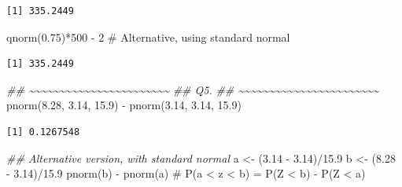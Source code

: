 \documentclass[
  letterpaper,
  DIV=11,
  numbers=noendperiod,
  oneside]{scrreprt}
\newenvironment{Shaded}{\begin{snugshade}}{\end{snugshade}}
\newcommand{\CommentTok}[1]{\textcolor[rgb]{0.37,0.37,0.37}{#1}}
\newcommand{\DecValTok}[1]{\textcolor[rgb]{0.68,0.00,0.00}{#1}}
\newcommand{\DocumentationTok}[1]{\textcolor[rgb]{0.37,0.37,0.37}{\textit{#1}}}
\newcommand{\FloatTok}[1]{\textcolor[rgb]{0.68,0.00,0.00}{#1}}
\newcommand{\FunctionTok}[1]{\textcolor[rgb]{0.28,0.35,0.67}{#1}}
\newcommand{\NormalTok}[1]{\textcolor[rgb]{0.00,0.23,0.31}{#1}}
\newcommand{\OtherTok}[1]{\textcolor[rgb]{0.00,0.23,0.31}{#1}}
\newcommand{\SpecialCharTok}[1]{\textcolor[rgb]{0.37,0.37,0.37}{#1}}
\begin{document}
\begin{verbatim}
[1] 335.2449
\end{verbatim}

\begin{Shaded}
\begin{Highlighting}[]
\FunctionTok{qnorm}\NormalTok{(}\FloatTok{0.75}\NormalTok{)}\SpecialCharTok{*}\DecValTok{500} \SpecialCharTok{{-}} \DecValTok{2} \CommentTok{\# Alternative, using standard normal}
\end{Highlighting}
\end{Shaded}

\begin{verbatim}
[1] 335.2449
\end{verbatim}

\begin{Shaded}
\begin{Highlighting}[]
\DocumentationTok{\#\# \textasciitilde{}\textasciitilde{}\textasciitilde{}\textasciitilde{}\textasciitilde{}\textasciitilde{}\textasciitilde{}\textasciitilde{}\textasciitilde{}\textasciitilde{}\textasciitilde{}\textasciitilde{}\textasciitilde{}\textasciitilde{}\textasciitilde{}\textasciitilde{}\textasciitilde{}\textasciitilde{}\textasciitilde{}\textasciitilde{}\textasciitilde{}\textasciitilde{}\textasciitilde{}}
\DocumentationTok{\#\# Q5.}
\DocumentationTok{\#\# \textasciitilde{}\textasciitilde{}\textasciitilde{}\textasciitilde{}\textasciitilde{}\textasciitilde{}\textasciitilde{}\textasciitilde{}\textasciitilde{}\textasciitilde{}\textasciitilde{}\textasciitilde{}\textasciitilde{}\textasciitilde{}\textasciitilde{}\textasciitilde{}\textasciitilde{}\textasciitilde{}\textasciitilde{}\textasciitilde{}\textasciitilde{}\textasciitilde{}\textasciitilde{}}
\FunctionTok{pnorm}\NormalTok{(}\FloatTok{8.28}\NormalTok{, }\FloatTok{3.14}\NormalTok{, }\FloatTok{15.9}\NormalTok{) }\SpecialCharTok{{-}} \FunctionTok{pnorm}\NormalTok{(}\FloatTok{3.14}\NormalTok{, }\FloatTok{3.14}\NormalTok{, }\FloatTok{15.9}\NormalTok{)}
\end{Highlighting}
\end{Shaded}

\begin{verbatim}
[1] 0.1267548
\end{verbatim}

\begin{Shaded}
\begin{Highlighting}[]
\DocumentationTok{\#\# Alternative version, with standard normal}
\NormalTok{a }\OtherTok{\textless{}{-}}\NormalTok{ (}\FloatTok{3.14} \SpecialCharTok{{-}} \FloatTok{3.14}\NormalTok{)}\SpecialCharTok{/}\FloatTok{15.9}
\NormalTok{b }\OtherTok{\textless{}{-}}\NormalTok{ (}\FloatTok{8.28} \SpecialCharTok{{-}} \FloatTok{3.14}\NormalTok{)}\SpecialCharTok{/}\FloatTok{15.9}
\FunctionTok{pnorm}\NormalTok{(b) }\SpecialCharTok{{-}} \FunctionTok{pnorm}\NormalTok{(a) }\CommentTok{\# P(a \textless{} z \textless{} b) = P(Z \textless{} b) {-} P(Z \textless{} a)}
\end{Highlighting}
\end{Shaded}
\end{document}
